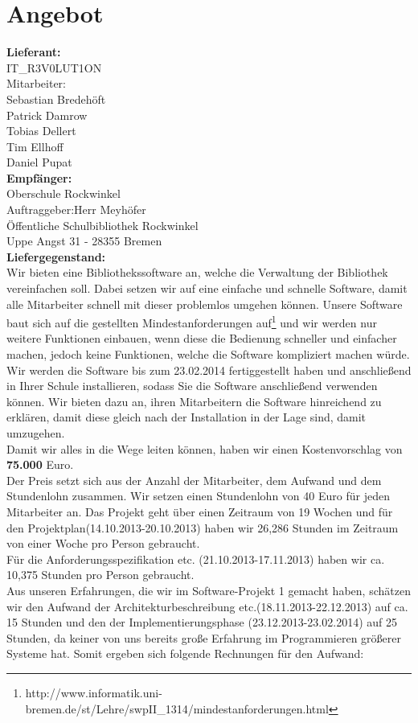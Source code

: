 \documentclass[fontsize=12pt,paper=a4,twoside]{scrartcl}
\begin{document}
\section*{Angebot}
\textbf{Lieferant:}\\
IT\_R3V0LUT1ON\\
Mitarbeiter:\\
Sebastian Bredehöft\\
Patrick Damrow\\
Tobias Dellert\\
Tim Ellhoff\\
Daniel Pupat\\

\textbf{Empfänger:}\\
Oberschule Rockwinkel\\
Auftraggeber:Herr Meyhöfer\\
Öffentliche Schulbibliothek Rockwinkel\\
Uppe Angst 31 - 28355 Bremen\\

\textbf{Liefergegenstand:}\\
Wir bieten eine Bibliothekssoftware an, welche die Verwaltung der Bibliothek vereinfachen soll. Dabei setzen wir auf eine einfache und schnelle Software, damit alle Mitarbeiter schnell mit dieser problemlos umgehen können. Unsere Software baut sich auf die gestellten Mindestanforderungen auf\footnote{http://www.informatik.uni-bremen.de/st/Lehre/swpII\_1314/mindestanforderungen.html} und wir werden nur weitere Funktionen einbauen, wenn diese die Bedienung schneller und einfacher machen, jedoch keine Funktionen, welche die Software kompliziert machen würde.\\
Wir werden die Software bis zum 23.02.2014 fertiggestellt haben und anschließend in Ihrer Schule installieren, sodass Sie die Software anschließend verwenden können. Wir bieten dazu an, ihren Mitarbeitern die Software hinreichend zu erklären, damit diese gleich nach der Installation in der Lage sind, damit umzugehen.\\
Damit wir alles in die Wege leiten können, haben wir einen Kostenvorschlag von \textbf{75.000} Euro.\\
Der Preis setzt sich aus der Anzahl der Mitarbeiter, dem Aufwand und dem Stundenlohn zusammen. Wir setzen einen Stundenlohn von 40 Euro für jeden Mitarbeiter an. Das Projekt geht über einen Zeitraum von 19 Wochen und für den Projektplan(14.10.2013-20.10.2013) haben wir 26,286 Stunden im Zeitraum von einer Woche pro Person gebraucht. \\
Für die Anforderungsspezifikation etc. (21.10.2013-17.11.2013) haben wir ca. 10,375 Stunden pro Person gebraucht. \\
Aus unseren Erfahrungen, die wir im Software-Projekt 1 gemacht haben, schätzen wir den Aufwand der Architekturbeschreibung etc.(18.11.2013-22.12.2013) auf ca. 15 Stunden und den der Implementierungsphase (23.12.2013-23.02.2014) auf 25 Stunden, da keiner von uns bereits große Erfahrung im Programmieren größerer Systeme hat. Somit ergeben sich folgende Rechnungen für den Aufwand:\\
\end{document}
